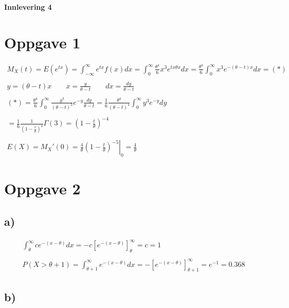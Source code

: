 \begin{center}
	\LARGE{\textbf{Innlevering 4}}
\end{center}


\section*{Oppgave 1}


\begin{gather*}
	M_X(t) = E(e^{t x}) = \int_{-\infty}^{\infty}{
		e^{t x} f(x) dx
	}
	=
	\int_0^\infty{
		\frac{\theta^4}{6} x^3 e^{t x \theta x} dx
	}
	=
	\frac{\theta^4}{6} \int_0^\infty{
		x^3 e^{-(\theta - t) x} dx
	} = (*)
	\\
	\\
	y = (\theta - t) x
	\qquad
	x = \frac{y}{\theta - t}
	\qquad
	dx = \frac{dy}{\theta - t}
	\\
	\\
	(*) = \frac{\theta^4}{6} \int_0^\infty{
		\frac{y^3}{(\theta - t)^3} e^{-y} \frac{dy}{\theta - t}
	}
	=
	\frac{1}{6} \frac{\theta^4}{(\theta - t)^4} \int_0^\infty{y^3 e^{-y} dy}
	\\
	\\
	=
	\frac{1}{6} \frac{1}{\left(1 - \frac{t}{\theta}\right)^4} \Gamma(3)
	=
	\left(1 - \frac{t}{\theta}\right)^{-4}
	\\
	\\
	E(X) = M_X'(0) = \left.
		\frac{4}{\theta} \left(
			1 - \frac{t}{\theta}
		\right)^{-5}
	\right|_0
	=
	\frac{4}{\theta}
\end{gather*}


\section*{Oppgave 2}

\subsection*{a)}


\begin{gather*}
	\int_\theta^\infty{c e^{- (x - \theta)} dx} = -c \left[e^{-(x - \theta)}\right]_\theta^\infty = c = 1
	\\
	\\
	P(X > \theta + 1) = \int_{\theta + 1}^\infty{e^{-(x - \theta)} dx} = -\left[e^{-(x - \theta)}\right]_{\theta + 1}^\infty
	=
	e^{-1} = 0.368
\end{gather*}


\subsection*{b)}

